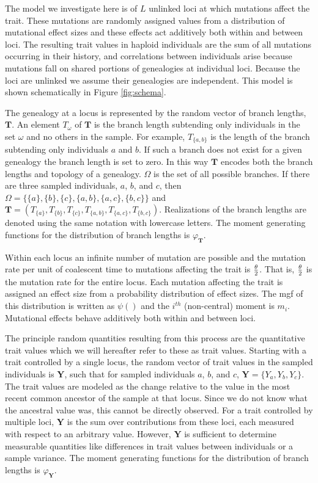 The model we investigate here is of $L$ unlinked loci at which mutations affect
the trait. These mutations are randomly assigned values from a distribution of
mutational effect sizes and these effects act additively both within and between
loci. The resulting trait values in haploid individuals are the sum of all
mutations occurring in their history, and correlations between individuals arise
because mutations fall on shared portions of genealogies at individual loci.
Because the loci are unlinked we assume their genealogies are independent. This
model is shown schematically in Figure \ref{fig:schema}.

The genealogy at a locus is represented by the random vector of branch lengths,
$\mathbf{T}$. An element $T_{\omega}$ of $\mathbf{T}$ is the branch length
subtending only individuals in the set $\omega$ and no others in the sample. For
example, $T_{\{a,b\}}$ is the length of the branch subtending only individuals
$a$ and $b$. If such a branch does not exist for a given genealogy the branch
length is set to zero. In this way $\mathbf{T}$ encodes both the branch lengths
and topology of a genealogy. $\Omega$ is the set of all possible branches. If
there are three sampled individuals, $a$, $b$, and $c$, then
$\Omega=\{\{a\},\{b\},\{c\},\{a,b\},\{a,c\},\{b,c\}\}$ and
$\mathbf{T}=(T_{\{a\}},T_{\{b\}},T_{\{c\}},T_{\{a,b\}},T_{\{a,c\}},T_{\{b,c\}})$.
Realizations of the branch lengths are denoted using the same notation with
lowercase letters. The moment generating functions for the distribution of
branch lengths is $\varphi_{\mathbf{T}}$. 

Within each locus an infinite number of mutation are possible and the mutation
rate per unit of coalescent time to mutations affecting the trait is $\frac{\theta}{2}$. That
is, $\frac{\theta}{2}$ is the mutation rate for the entire locus. Each mutation affecting the
trait is assigned an effect size from a probability distribution of effect
sizes. The mgf of this distribution is written as $\psi()$ and the $i^{th}$
(non-central) moment is $m_i$. Mutational effects behave additively both within
and between loci.

The principle random quantities resulting from this process are the quantitative
trait values which we will hereafter refer to these as trait values. Starting
with a trait controlled by a single locus, the random vector of trait values in
the sampled individuals is $\mathbf{Y}$, such that for sampled individuals $a$,
$b$, and $c$, $\mathbf{Y}=\{Y_a,Y_b,Y_c\}$. The trait values are modeled as the
change relative to the value in the most recent common ancestor of the sample at
that locus. Since we do not know what the ancestral value was, this cannot be
directly observed. For a trait controlled by multiple loci, $\mathbf{Y}$ is the
sum over contributions from these loci, each measured with respect to an
arbitrary value. However, $\mathbf{Y}$ is sufficient to determine measurable
quantities like differences in trait values between individuals or a sample
variance. The moment generating functions for the distribution of branch lengths
is $\varphi_{\mathbf{Y}}$.

